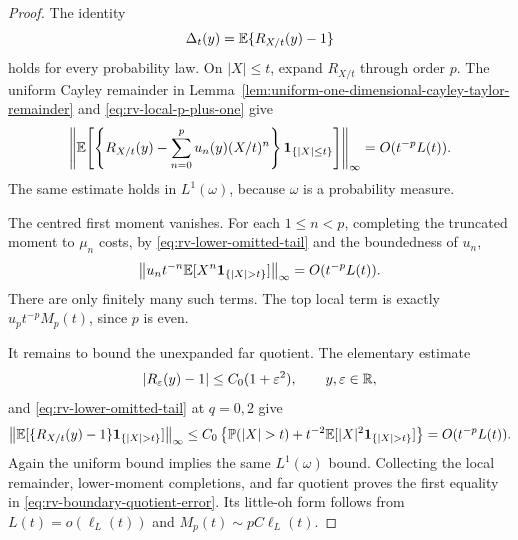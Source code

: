 \begin{proof}
The identity
\[
 \Delta_t(y)=\mathbb{E}\{R_{X/t}(y)-1\}
\]
holds for every probability law.  On \(|X|\le t\), expand
\(R_{X/t}\) through order \(p\).  The uniform Cayley remainder in
Lemma~\ref{lem:uniform-one-dimensional-cayley-taylor-remainder} and
\eqref{eq:rv-local-p-plus-one} give
\begin{equation}\label{eq:rv-local-quotient-error}
 \left\|
 \mathbb{E}\!\left[
 \left\{R_{X/t}(y)-\sum_{n=0}^pu_n(y)(X/t)^n\right\}
 \mathbf1_{\{|X|\le t\}}\right]
 \right\|_\infty
 =O(t^{-p}L(t)).
\end{equation}
The same estimate holds in \(L^1(\omega)\), because \(\omega\) is a
probability measure.

The centred first moment vanishes.  For each \(1\le n<p\), completing the
truncated moment to \(\mu_n\) costs, by
\eqref{eq:rv-lower-omitted-tail} and the boundedness of \(u_n\),
\[
 \left\|u_nt^{-n}
 \EE[X^n\mathbf1_{\{|X|>t\}}]\right\|_\infty
 =O(t^{-p}L(t)).
\]
There are only finitely many such terms.  The top local term is exactly
\(u_pt^{-p}M_p(t)\), since \(p\) is even.

It remains to bound the unexpanded far quotient.  The elementary estimate
\[
 |R_\varepsilon(y)-1|\le C_0(1+\varepsilon^2),
 \qquad y,\varepsilon\in\mathbb{R},
\]
and \eqref{eq:rv-lower-omitted-tail} at \(q=0,2\) give
\[
 \left\|\EE[
 \{R_{X/t}(y)-1\}\mathbf1_{\{|X|>t\}}]\right\|_\infty
 \le C_0\left\{\mathbb P(|X|>t)
 +t^{-2}\EE[|X|^2\mathbf1_{\{|X|>t\}}]\right\}
 =O(t^{-p}L(t)).
\]
Again the uniform bound implies the same \(L^1(\omega)\) bound.
Collecting the local remainder, lower-moment completions, and far quotient
proves the first equality in \eqref{eq:rv-boundary-quotient-error}.  Its
little-oh form follows from
\(L(t)=o(\ell_L(t))\) and
\(M_p(t)\sim pC\ell_L(t)\).
\end{proof}

